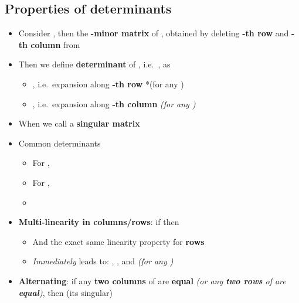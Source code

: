\subsection*{Properties of
determinants}

\begin{itemize}

\item
  Consider , then
   the
  \textbf{-minor matrix} of , obtained by deleting
  \textbf{-th row} and \textbf{-th column} from
\item
  Then we define \textbf{determinant} of ,
  i.e.~, as

  \begin{itemize}
  
  \item
    ,
    i.e.~expansion along \textbf{-th row} *(for any )
  \item
    ,
    i.e.~expansion along \textbf{-th column} \emph{(for any
    )}
  \end{itemize}
\item
  When  we call  a \textbf{singular matrix}
\item
  Common determinants

  \begin{itemize}
  
  \item
    For , 
  \item
    For , 
  \item
  \end{itemize}
\item
  \textbf{Multi-linearity in columns/rows}: if
  then

  \begin{itemize}
  
  \item
    And the exact same linearity property for \textbf{rows}
  \item
    \emph{Immediately} leads to: ,
    , and 
    \emph{(for any )}
  \end{itemize}
\item
  \textbf{Alternating}: if any \textbf{two columns} of  are
  \textbf{equal} \emph{(or any \textbf{two rows} of  are
  \textbf{equal})}, then  (its singular)


\end{itemize}
